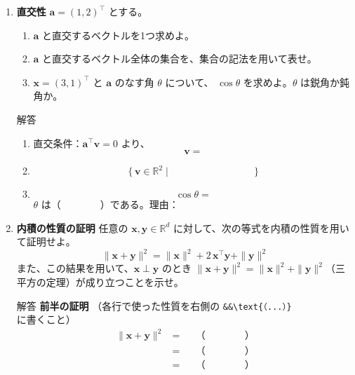 \documentclass[a4paper,dvipdfmx]{jsarticle}
\newcommand{\学籍番号}{0000000}
\newcommand{\氏名}{氏名を書く}
\newcommand{\提出日}{2026年10月8日}
\newenvironment{answer}{\begin{itembox}[l]{解答}}{\end{itembox}}
\begin{document}
\begin{enumerate}
  \item \textbf{直交性}\quad
    $\bm{a} = (1, 2)^\top$ とする。
    \begin{enumerate}
      \item $\bm{a}$ と直交するベクトルを1つ求めよ。
      \item $\bm{a}$ と直交するベクトル全体の集合を、集合の記法を用いて表せ。
      \item $\bm{x} = (3, 1)^\top$ と $\bm{a}$ のなす角 $\theta$ について、
        $\cos\theta$ を求めよ。$\theta$ は鋭角か鈍角か。
    \end{enumerate}
    \begin{answer}
      \begin{enumerate}
        \item 直交条件：$\bm{a}^\top \bm{v} = 0$ より、
          \begin{equation*}
            \bm{v} =
          \end{equation*}
        \item
          \begin{equation*}
            \{\, \bm{v} \in \mathbb{R}^2 \mid \phantom{XXXXXXXXXX} \,\}
          \end{equation*}
        \item
          \begin{equation*}
            \cos\theta =
          \end{equation*}
          $\theta$ は（　　　　）である。理由：
      \end{enumerate}
    \end{answer}

  \item \textbf{内積の性質の証明}\quad
    任意の $\bm{x}, \bm{y} \in \mathbb{R}^d$ に対して、次の等式を内積の性質を用いて証明せよ。
    \begin{equation*}
      \|\bm{x} + \bm{y}\|^2 = \|\bm{x}\|^2 + 2\,\bm{x}^\top \bm{y} + \|\bm{y}\|^2
    \end{equation*}
    また、この結果を用いて、$\bm{x} \perp \bm{y}$ のとき
    $\|\bm{x} + \bm{y}\|^2 = \|\bm{x}\|^2 + \|\bm{y}\|^2$（三平方の定理）が成り立つことを示せ。
    \begin{answer}
      \textbf{前半の証明}\quad
      （各行で使った性質を右側の \verb|&&\text{（...）}| に書くこと）
      \begin{align*}
        \|\bm{x} + \bm{y}\|^2 &= && \text{（　　　　）} \\
                              &= && \text{（　　　　）} \\
                              &= && \text{（　　　　）}
      \end{align*}


\end{answer}
\end{enumerate}
\end{document}
